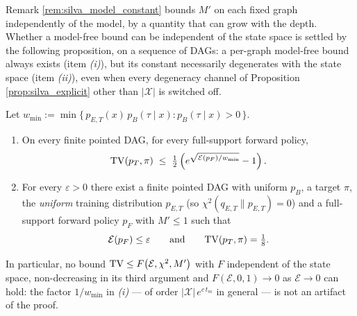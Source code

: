 Remark \ref{rem:silva_model_constant} bounds $M'$ on each fixed graph independently of the model, by a quantity that can grow with the depth. Whether a model-free bound can be independent of the state space is settled by the following proposition, on a sequence of DAGs: a per-graph model-free bound always exists (item \emph{(i)}), but its constant necessarily degenerates with the state space (item \emph{(ii)}), even when every degeneracy channel of Proposition \ref{prop:silva_explicit} other than $|\mathcal X|$ is switched off.

\begin{proposition}\label{prop:silva_no_uniform}
Let $w_{\min} := \min\{\,p_{E,T}(x)\,p_B(\tau\mid x) : p_B(\tau\mid x)>0\,\}$.
\begin{enumerate}
    \item On every finite pointed DAG, for every full-support forward policy,
    \begin{equation}
        \mathrm{TV}(p_T,\pi) \;\leq\; \tfrac12\left(e^{\sqrt{\mathcal E(p_F)/w_{\min}}}-1\right).
    \end{equation}
    \item For every $\varepsilon>0$ there exist a finite pointed DAG with uniform $p_B$, a target $\pi$, the \emph{uniform} training distribution $p_{E,T}$ (so $\chi^2(q_{E,T}\|p_{E,T})=0$) and a full-support forward policy $p_F$ with $M'\leq 1$ such that
    \begin{equation}
        \mathcal E(p_F)\leq\varepsilon \qquad\text{and}\qquad \mathrm{TV}(p_T,\pi)=\tfrac18 .
    \end{equation}
\end{enumerate}
In particular, no bound $\mathrm{TV}\leq F\bigl(\mathcal E,\chi^2,M'\bigr)$ with $F$ independent of the state space, non-decreasing in its third argument and $F(\mathcal E,0,1)\rightarrow0$ as $\mathcal E\rightarrow0$ can hold: the factor $1/w_{\min}$ in \emph{(i)} --- of order $|\mathcal X|\,e^{c\,t_m}$ in general --- is not an artifact of the proof.
\end{proposition}
